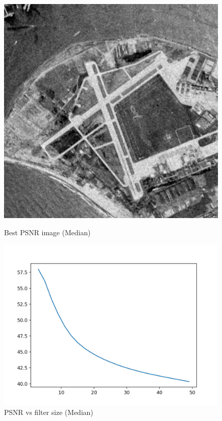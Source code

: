 \documentclass{article}
\begin{document}
    \begin{figure}[!htb]
      \includegraphics[scale=0.3]{./basic_denoising/sandiego/median_best_gaussian.png}
      \caption{Best PSNR image (Median)}
    \endminipage \hfill
      \includegraphics[scale=.45]{./basic_denoising/sandiego/median_psnr_gaussian.png}
      \caption{PSNR vs filter size (Median)}
    \endminipage
    \end{figure}
    \pagebreak
\end{document}
